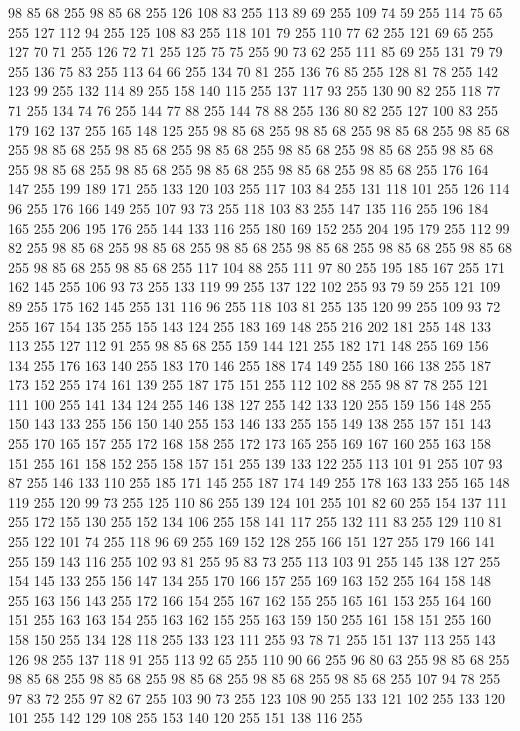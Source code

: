 98 85 68 255 98 85 68 255 126 108 83 255 113 89 69 255 109 74 59 255 114 75 65 255 127 112 94 255 125 108 83 255 118 101 79 255 110 77 62 255 121 69 65 255 127 70 71 255 126 72 71 255 125 75 75 255 90 73 62 255 111 85 69 255 131 79 79 255 136 75 83 255 113 64 66 255 134 70 81 255 136 76 85 255 128 81 78 255 142 123 99 255 132 114 89 255 158 140 115 255 137 117 93 255 130 90 82 255 118 77 71 255 134 74 76 255 144 77 88 255 144 78 88 255 136 80 82 255 127 100 83 255 179 162 137 255 165 148 125 255 98 85 68 255 98 85 68 255 98 85 68 255 98 85 68 255 98 85 68 255 98 85 68 255 98 85 68 255 98 85 68 255 98 85 68 255 98 85 68 255 98 85 68 255 98 85 68 255 98 85 68 255 98 85 68 255 98 85 68 255 176 164 147 255 199 189 171 255 133 120 103 255 117 103 84 255 131 118 101 255 126 114 96 255 176 166 149 255 107 93 73 255 118 103 83 255 147 135 116 255 196 184 165 255 206 195 176 255 144 133 116 255 180 169 152 255
204 195 179 255 112 99 82 255 98 85 68 255 98 85 68 255 98 85 68 255 98 85 68 255 98 85 68 255 98 85 68 255 98 85 68 255 98 85 68 255 117 104 88 255 111 97 80 255 195 185 167 255 171 162 145 255 106 93 73 255 133 119 99 255 137 122 102 255 93 79 59 255 121 109 89 255 175 162 145 255 131 116 96 255 118 103 81 255 135 120 99 255 109 93 72 255 167 154 135 255 155 143 124 255 183 169 148 255 216 202 181 255 148 133 113 255 127 112 91 255 98 85 68 255 159 144 121 255 182 171 148 255 169 156 134 255 176 163 140 255 183 170 146 255 188 174 149 255 180 166 138 255 187 173 152 255 174 161 139 255 187 175 151 255 112 102 88 255 98 87 78 255 121 111 100 255 141 134 124 255 146 138 127 255 142 133 120 255 159 156 148 255 150 143 133 255 156 150 140 255 153 146 133 255 155 149 138 255 157 151 143 255 170 165 157 255 172 168 158 255 172 173 165 255 169 167 160 255 163 158 151 255 161 158 152 255 158 157 151 255 139 133 122 255 113 101 91 255 107 93 87 255 146 133 110 255
185 171 145 255 187 174 149 255 178 163 133 255 165 148 119 255 120 99 73 255 125 110 86 255 139 124 101 255 101 82 60 255 154 137 111 255 172 155 130 255 152 134 106 255 158 141 117 255 132 111 83 255 129 110 81 255 122 101 74 255 118 96 69 255 169 152 128 255 166 151 127 255 179 166 141 255 159 143 116 255 102 93 81 255 95 83 73 255 113 103 91 255 145 138 127 255 154 145 133 255 156 147 134 255 170 166 157 255 169 163 152 255 164 158 148 255 163 156 143 255 172 166 154 255 167 162 155 255 165 161 153 255 164 160 151 255 163 163 154 255 163 162 155 255 163 159 150 255 161 158 151 255 160 158 150 255 134 128 118 255 133 123 111 255 93 78 71 255 151 137 113 255 143 126 98 255 137 118 91 255 113 92 65 255 110 90 66 255 96 80 63 255 98 85 68 255 98 85 68 255 98 85 68 255 98 85 68 255 98 85 68 255 98 85 68 255 107 94 78 255 97 83 72 255 97 82 67 255 103 90 73 255 123 108 90 255 133 121 102 255 133 120 101 255 142 129 108 255 153 140 120 255 151 138 116 255

